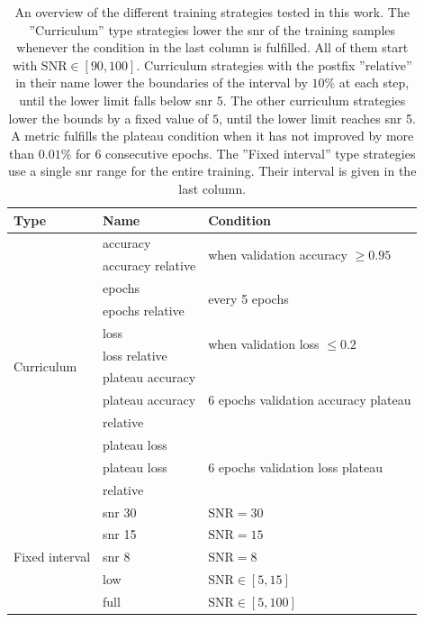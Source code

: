 \begin{table}
\caption[Training strategy overview]{An overview of the different training strategies tested in this work. The ''Curriculum'' type strategies lower the \acrshort{snr} of the training samples whenever the condition in the last column is fulfilled. All of them start with  $\mathrm{SNR}\in\left[90, 100\right]$. Curriculum strategies with the postfix ''relative'' in their name lower the boundaries of the interval by $10\%$ at each step, until the lower limit falls below \acrshort{snr} 5. The other curriculum strategies lower the bounds by a fixed value of $5$, until the lower limit reaches \acrshort{snr} 5. A metric fulfills the plateau condition when it has not improved by more than $0.01\%$ for $6$ consecutive epochs. The ''Fixed interval'' type strategies use a single \acrshort{snr} range for the entire training. Their interval is given in the last column. }
\label{tab:studies}
\begin{tabularx}{\textwidth}{l|l|X}
    \hline\hline
    \multicolumn{1}{l}{Type} & \multicolumn{1}{l}{Name} & \multicolumn{1}{l}{Condition} \\
    \hline
    \multirow{12}{*}{Curriculum} & accuracy & \multirow{2}{*}{\parbox[t]{\linewidth}{when validation accuracy $\geq 0.95$}}\\
    \cline{2-2}
    & accuracy relative & \\
    \cline{2-3}
    & epochs & \multirow{2}{*}{every 5 epochs} \\
    \cline{2-2}
    & epochs relative & \\
    \cline{2-3}
    & loss & \multirow{2}{*}{\parbox[t]{\linewidth}{when validation loss $\leq 0.2$}} \\
    \cline{2-2}
    & loss relative & \\
    \cline{2-3}
    & plateau accuracy & \multirow{3}{*}{\parbox[t]{\linewidth}{6 epochs validation accuracy plateau}} \\
    \cline{2-2}
    & plateau accuracy & \\
    & relative & \\
    \cline{2-3}
    & plateau loss & \multirow{3}{*}{\parbox[t]{\linewidth}{6 epochs validation loss plateau}} \\
    \cline{2-2}
    & plateau loss & \\
    & relative & \\
    \hline
    \multirow{5}{*}{Fixed interval} & \acrshort{snr} 30 & $\mathrm{SNR}=30$ \\
 \cline{2-3}
    & \acrshort{snr} 15 & $\mathrm{SNR}=15$ \\
    \cline{2-3}
    & \acrshort{snr} 8 & $\mathrm{SNR}=8$ \\
     \cline{2-3}
    & low & $\mathrm{SNR}\in \left[5, 15\right]$ \\
     \cline{2-3}
    & full & $\mathrm{SNR}\in \left[5, 100\right]$ \\
    \hline\hline
\end{tabularx}
\end{table}

